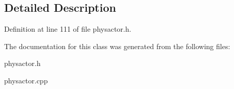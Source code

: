 \subsection{Detailed Description}


Definition at line 111 of file physactor.h.

The documentation for this class was generated from the following files:\begin{DoxyCompactItemize}
\item 
physactor.h\item 
physactor.cpp\end{DoxyCompactItemize}
